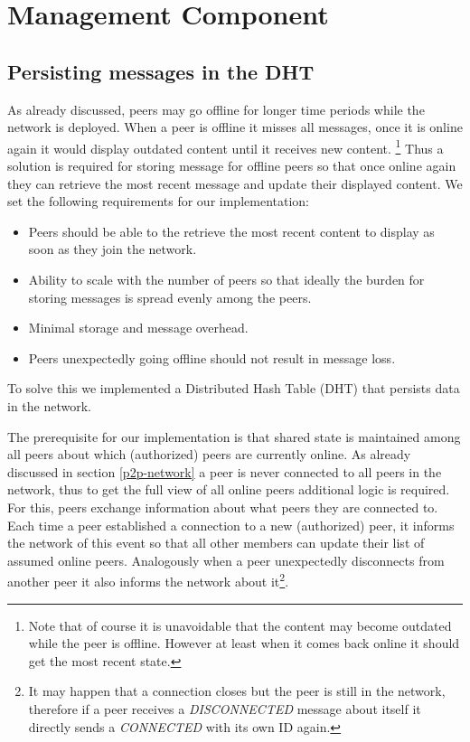 \section{Management Component}

\subsection{Persisting messages in the DHT}

As already discussed, peers may go offline for longer time periods while the network is deployed.
When a peer is offline it misses all messages, once it is online again it would display outdated content until it receives new content. \footnote{Note that of course it is unavoidable that the content may become outdated while the peer is offline. However at least when it comes back online it should get the most recent state.}
Thus a solution is required for storing message for offline peers so that once online again they can retrieve the most recent message and update their displayed content.
We set the following requirements for our implementation:
\begin{itemize}
    \item Peers should be able to the retrieve the most recent content to display as soon as they join the network.
    \item Ability to scale with the number of peers so that ideally the burden for storing messages is spread evenly among the peers.
    \item Minimal storage and message overhead.
    \item Peers unexpectedly going offline should not result in message loss.
\end{itemize}
To solve this we implemented a Distributed Hash Table (DHT) that persists data in the network.

The prerequisite for our implementation is that shared state is maintained among all peers about which (authorized) peers are currently online. 
As already discussed in section \ref{p2p-network} a peer is never connected to all peers in the network, thus to get the full view of all online peers additional logic is required.
For this, peers exchange information about what peers they are connected to. 
Each time a peer established a connection to a new (authorized) peer, it informs the network of this event so that all other members can update their list of assumed online peers.
Analogously when a peer unexpectedly disconnects from another peer it also informs the network about it\footnote{It may happen that a connection closes but the peer is still in the network, therefore if a peer receives a \textit{DISCONNECTED} message about itself it directly sends a \textit{CONNECTED} with its own ID again.}.

